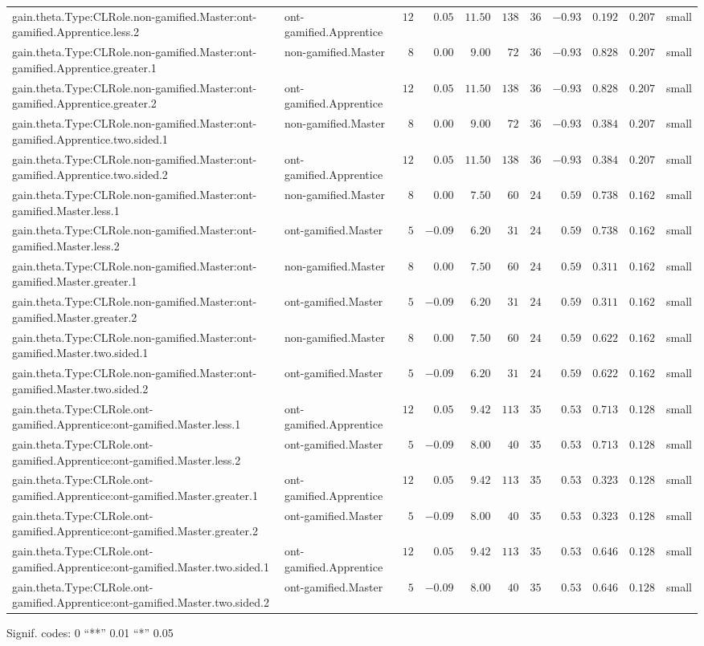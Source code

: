 \documentclass[6pt]{article}
\begin{document}
\begin{landscape}
{\begin{longtable}{llrrrrrrrrl}
gain.theta.Type:CLRole.non-gamified.Master:ont-gamified.Apprentice.less.2&ont-gamified.Apprentice&$12$&$ 0.05$&$11.50$&$138$&$ 36$&$-0.93$&$0.192$&$0.207$&small\tabularnewline
gain.theta.Type:CLRole.non-gamified.Master:ont-gamified.Apprentice.greater.1&non-gamified.Master&$ 8$&$ 0.00$&$ 9.00$&$ 72$&$ 36$&$-0.93$&$0.828$&$0.207$&small\tabularnewline
gain.theta.Type:CLRole.non-gamified.Master:ont-gamified.Apprentice.greater.2&ont-gamified.Apprentice&$12$&$ 0.05$&$11.50$&$138$&$ 36$&$-0.93$&$0.828$&$0.207$&small\tabularnewline
gain.theta.Type:CLRole.non-gamified.Master:ont-gamified.Apprentice.two.sided.1&non-gamified.Master&$ 8$&$ 0.00$&$ 9.00$&$ 72$&$ 36$&$-0.93$&$0.384$&$0.207$&small\tabularnewline
gain.theta.Type:CLRole.non-gamified.Master:ont-gamified.Apprentice.two.sided.2&ont-gamified.Apprentice&$12$&$ 0.05$&$11.50$&$138$&$ 36$&$-0.93$&$0.384$&$0.207$&small\tabularnewline
gain.theta.Type:CLRole.non-gamified.Master:ont-gamified.Master.less.1&non-gamified.Master&$ 8$&$ 0.00$&$ 7.50$&$ 60$&$ 24$&$ 0.59$&$0.738$&$0.162$&small\tabularnewline
gain.theta.Type:CLRole.non-gamified.Master:ont-gamified.Master.less.2&ont-gamified.Master&$ 5$&$-0.09$&$ 6.20$&$ 31$&$ 24$&$ 0.59$&$0.738$&$0.162$&small\tabularnewline
gain.theta.Type:CLRole.non-gamified.Master:ont-gamified.Master.greater.1&non-gamified.Master&$ 8$&$ 0.00$&$ 7.50$&$ 60$&$ 24$&$ 0.59$&$0.311$&$0.162$&small\tabularnewline
gain.theta.Type:CLRole.non-gamified.Master:ont-gamified.Master.greater.2&ont-gamified.Master&$ 5$&$-0.09$&$ 6.20$&$ 31$&$ 24$&$ 0.59$&$0.311$&$0.162$&small\tabularnewline
gain.theta.Type:CLRole.non-gamified.Master:ont-gamified.Master.two.sided.1&non-gamified.Master&$ 8$&$ 0.00$&$ 7.50$&$ 60$&$ 24$&$ 0.59$&$0.622$&$0.162$&small\tabularnewline
gain.theta.Type:CLRole.non-gamified.Master:ont-gamified.Master.two.sided.2&ont-gamified.Master&$ 5$&$-0.09$&$ 6.20$&$ 31$&$ 24$&$ 0.59$&$0.622$&$0.162$&small\tabularnewline
gain.theta.Type:CLRole.ont-gamified.Apprentice:ont-gamified.Master.less.1&ont-gamified.Apprentice&$12$&$ 0.05$&$ 9.42$&$113$&$ 35$&$ 0.53$&$0.713$&$0.128$&small\tabularnewline
gain.theta.Type:CLRole.ont-gamified.Apprentice:ont-gamified.Master.less.2&ont-gamified.Master&$ 5$&$-0.09$&$ 8.00$&$ 40$&$ 35$&$ 0.53$&$0.713$&$0.128$&small\tabularnewline
gain.theta.Type:CLRole.ont-gamified.Apprentice:ont-gamified.Master.greater.1&ont-gamified.Apprentice&$12$&$ 0.05$&$ 9.42$&$113$&$ 35$&$ 0.53$&$0.323$&$0.128$&small\tabularnewline
gain.theta.Type:CLRole.ont-gamified.Apprentice:ont-gamified.Master.greater.2&ont-gamified.Master&$ 5$&$-0.09$&$ 8.00$&$ 40$&$ 35$&$ 0.53$&$0.323$&$0.128$&small\tabularnewline
\newpage
gain.theta.Type:CLRole.ont-gamified.Apprentice:ont-gamified.Master.two.sided.1&ont-gamified.Apprentice&$12$&$ 0.05$&$ 9.42$&$113$&$ 35$&$ 0.53$&$0.646$&$0.128$&small\tabularnewline
gain.theta.Type:CLRole.ont-gamified.Apprentice:ont-gamified.Master.two.sided.2&ont-gamified.Master&$ 5$&$-0.09$&$ 8.00$&$ 40$&$ 35$&$ 0.53$&$0.646$&$0.128$&small\tabularnewline
\hline
\end{longtable}}\end{landscape}
\begin{flushright}{ \tiny{ Signif. codes:  0 ``**'' 0.01 ``*'' 0.05 }}\end{flushright} 
\end{document}
